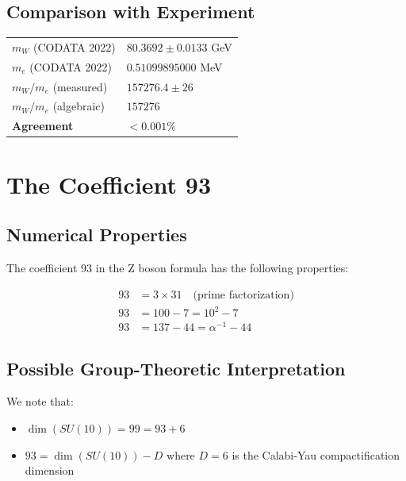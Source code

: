 \documentclass[11pt,a4paper]{article}
\begin{document}
\subsection{Comparison with Experiment}

\begin{center}
\begin{tabular}{ll}
\hline
$m_W$ (CODATA 2022) & $80.3692 \pm 0.0133$ GeV \\
$m_e$ (CODATA 2022) & $0.51099895000$ MeV \\
$m_W/m_e$ (measured) & $157276.4 \pm 26$ \\
$m_W/m_e$ (algebraic) & $157276$ \\
\textbf{Agreement} & $< 0.001\%$ \\
\hline
\end{tabular}
\end{center}

\section{The Coefficient 93}

\subsection{Numerical Properties}

The coefficient 93 in the Z boson formula has the following properties:

\begin{align}
93 &= 3 \times 31 \quad \text{(prime factorization)} \\
93 &= 100 - 7 = 10^2 - 7 \\
93 &= 137 - 44 = \alpha^{-1} - 44
\end{align}

\subsection{Possible Group-Theoretic Interpretation}

We note that:
\begin{itemize}
    \item $\dim(SU(10)) = 99 = 93 + 6$
    \item $93 = \dim(SU(10)) - D$ where $D = 6$ is the Calabi-Yau compactification dimension
\end{itemize}
\end{document}
